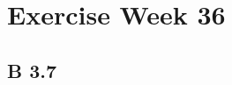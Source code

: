 \documentclass{article}
\theoremstyle{remark}
\begin{document}
  






  
  





\section{Exercise Week 36}%
\label{sec:exercise_week_36}

\subsection{B 3.7 }%
\label{sub:problem_b_3_7_}
\end{document}
